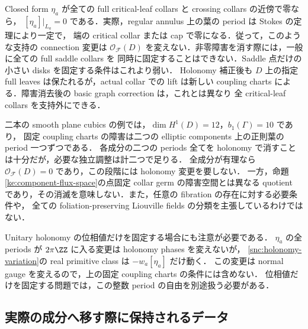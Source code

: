 \begin{remark}\label{snc:saddle-support-obstruction}
Closed form $\eta_a$ が全ての full critical-leaf collars と crossing collars の近傍で零なら，
$[\eta_a]|_{L_a}=0$ である．実際，regular annulus 上の葉の period は Stokes の定理により一定で，
端の critical collar または cap で零になる．従って，このような支持の connection 変更は
$\mathcal O_{\mathcal F}(D)$ を変えない．非零障害を消す際には，一般に全ての full saddle collars を
同時に固定することはできない．Saddle 点だけの小さい disks を固定する条件はこれより弱い．
Holonomy 補正後も $D$ 上の指定 full leaves は保たれるが，actual collar での lift は新しい
coupling charts による．障害消去後の basic graph correction は，これとは異なり
全 critical-leaf collars を支持外にできる．
\end{remark}

二本の smooth plane cubics の例では，$\dim H^1(D)=12$，$b_1(\Gamma)=10$ であり，
固定 coupling charts の障害は二つの elliptic components 上の正則葉の period 一つずつである．
各成分の二つの periods 全てを holonomy で消すことは十分だが，必要な独立調整は計二つで足りる．
全成分が有理なら $\mathcal O_{\mathcal F}(D)=0$ であり，この段階には holonomy 変更を要しない．
一方，命題\ref{ke:component-flux-space}の点固定 collar germ の障害空間とは異なる quotient
であり，その消滅を意味しない．また，任意の fibration の存在に対する必要条件や，
全ての foliation-preserving Liouville fields の分類を主張しているわけではない．

Unitary holonomy の位相値だけを固定する場合にも注意が必要である．
$\eta_a$ の全 periods が $2\pi\ZZ$ に入る変更は holonomy phases を変えないが，
\eqref{snc:holonomy-variation}の real primitive class は $-w_a[\eta_a]$ だけ動く．
この変更は normal gauge を変えるので，上の固定 coupling charts の条件には含めない．
位相値だけを固定する問題では，この整数 period の自由を別途扱う必要がある．

\subsection{実際の成分へ移す際に保持されるデータ}
\label{snc:output-data}

